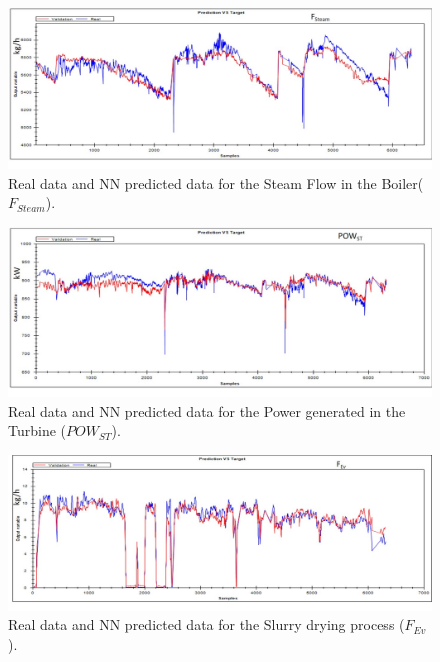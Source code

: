 \begin{figure}
\centering
\includegraphics[width=1\textwidth]{ANN-EXHAUSTRECOVERY.pdf}
\caption{Real data and NN predicted data for the Steam Flow in the Boiler($F_{Steam}$).}
\label{Fboiler}
\end{figure}

\begin{figure}
\centering
\includegraphics[width=1\textwidth]{ANN-ST.pdf}
\caption{Real data and NN predicted data for the Power generated in the Turbine ($POW_{ST}$).}
\label{Pturbine}
\end{figure}

\begin{figure}
\centering
\includegraphics[width=1\textwidth]{ANN-Evaporator.pdf}
\caption{Real data and NN predicted data for the Slurry drying process ($F_{Ev}$).}
\label{PEvaporator}
\end{figure}
